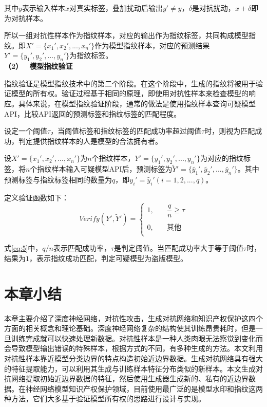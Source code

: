 其中$y$表示输入样本$x$对真实标签，叠加扰动后输出$y' \neq y$，$\delta$是对抗扰动，$x + \delta$即为对抗样本。

所以一组对抗性样本作为指纹样本，对应的输出作为指纹标签，共同构成模型指纹。即$X' = \{x_1',x_2',...,x_n'\}$作为模型指纹样本，对应的预测结果$Y' = \{y_1', y_2',...,y_n'\}$为指纹标签。\\

\noindent\textbf{（2） \ 模型指纹验证   }

指纹验证是模型指纹技术中的第二个阶段。在这个阶段中，生成的指纹将被用于验证模型的所有权。验证过程基于相同的原理，即使用对抗性样本来检查模型的响应。具体来说，在模型指纹验证阶段，通常的做法是使用指纹样本查询可疑模型API，比较API返回的预测标签和指纹标签的匹配程度。

设定一个阈值$\tau$，当阈值标签和指纹标签的匹配成功率超过阈值$\tau$时，则视为匹配成功，判定提供指纹样本的人是模型的合法拥有者。

设$X' = \{x_1',x_2',...,x_n'\}$为$n$个指纹样本，$Y' = \{y_1', y_2',...,y_n'\}$为对应的指纹标签，将$n$个指纹样本输入可疑模型API后，预测标签为$\widetilde{Y}' = \{\widetilde{y_1}', \widetilde{y_2}',...,\widetilde{y_n}'\}$。其中预测标签与指纹标签相同的数量为$q$，即$y_i' = \widetilde{y_i}'(i = 1, 2,...,q)$。

定义验证函数如下：
\begin{equation}
	\label{eq:5}
	Verify(Y', \widetilde{Y}')= \left
	\{ 
	\begin{array}{ll} 
		1, &\quad \dfrac{q}{n} \geq \tau \\ 
		\\
		0, &\quad \mbox{其他}\\ 
	\end{array} 
	\right.
\end{equation}

式\ref{eq:5}中，$q/n$表示匹配成功率，$\tau$是判定阈值。当匹配成功率大于等于阈值$\tau$时，结果为$1$，表示指纹成功匹配，判定可疑模型为盗版模型。


\section{本章小结}

本章主要介绍了深度神经网络，对抗性攻击，生成对抗网络和知识产权保护这四个方面的相关概念和理论基础。深度神经网络复杂的结构使其训练昂贵耗时，但是一旦训练完成就可以快速处理新数据。对抗性样本是一种人类肉眼无法察觉到变化而会导致模型输出错误的特殊样本，根据方式的不同，有多种生成的方法。本文利用对抗性样本靠近模型分类边界的特点构造初始近边界数据。生成对抗网络具有强大的特征提取能力，可以利用其生成与训练样本特征分布类似的新样本。本文生成对抗网络提取初始近边界数据的特征，然后使用生成器生成新的、私有的近边界数据。在神经网络模型知识产权保护领域，目前使用最广泛的是模型水印和指纹这两种方法，它们大多基于验证模型所有权的思路进行设计与实现。
